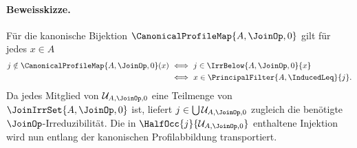 \documentclass[main.tex]{subfiles}
\begin{document}
\paragraph{Beweisskizze.}
Für die kanonische Bijektion
\(\CanonicalProfileMap{A,\JoinOp,0}\) gilt für jedes \(x\in A\)
\[
  \begin{aligned}
  j\notin \CanonicalProfileMap{A,\JoinOp,0}(x)
  &\ \Longleftrightarrow\
    j\in\IrrBelow{A,\JoinOp,0}{x}\\
  &\ \Longleftrightarrow\
    x\in\PrincipalFilter{A,\InducedLeq}{j}.
  \end{aligned}
\]
Da jedes Mitglied von \(\mathcal U_{A,\JoinOp,0}\) eine Teilmenge von
\(\JoinIrrSet{A,\JoinOp,0}\) ist, liefert
\(j\in\bigcup\mathcal U_{A,\JoinOp,0}\) zugleich die benötigte
\(\JoinOp\)-Irreduzibilität. Die in \(\HalfOcc{j}{\mathcal U_{A,\JoinOp,0}}\) enthaltene
Injektion wird nun entlang der kanonischen Profilabbildung transportiert.
\end{document}
